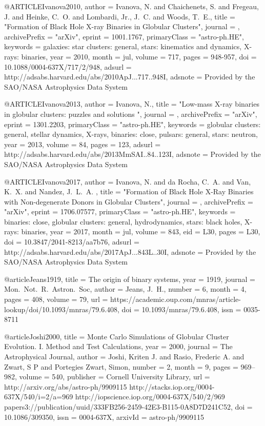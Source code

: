 \documentclass[twocolumn,tighten]{aastex63}
\begin{document}
{{{{{@ARTICLE{Ivanova2010,
   author = {{Ivanova}, N. and {Chaichenets}, S. and {Fregeau}, J. and {Heinke}, C.~O. and 
	{Lombardi}, Jr., J.~C. and {Woods}, T.~E.},
    title = "{Formation of Black Hole X-ray Binaries in Globular Clusters}",
  journal = {\apj},
archivePrefix = "arXiv",
   eprint = {1001.1767},
 primaryClass = "astro-ph.HE",
 keywords = {galaxies: star clusters: general, stars: kinematics and dynamics, X-rays: binaries},
     year = 2010,
    month = jul,
   volume = 717,
    pages = {948-957},
      doi = {10.1088/0004-637X/717/2/948},
   adsurl = {http://adsabs.harvard.edu/abs/2010ApJ...717..948I},
  adsnote = {Provided by the SAO/NASA Astrophysics Data System}
}

@ARTICLE{Ivanova2013,
   author = {{Ivanova}, N.},
    title = "{Low-mass X-ray binaries in globular clusters: puzzles and solutions }",
  journal = {\memsai},
archivePrefix = "arXiv",
   eprint = {1301.2203},
 primaryClass = "astro-ph.HE",
 keywords = {globular clusters: general, stellar dynamics, X-rays, binaries: close, pulsars: general, stars: neutron},
     year = 2013,
   volume = 84,
    pages = {123},
   adsurl = {http://adsabs.harvard.edu/abs/2013MmSAI..84..123I},
  adsnote = {Provided by the SAO/NASA Astrophysics Data System}
}

@ARTICLE{Ivanova2017,
   author = {{Ivanova}, N. and {da Rocha}, C.~A. and {Van}, K.~X. and {Nandez}, J.~L.~A.
	},
    title = "{Formation of Black Hole X-Ray Binaries with Non-degenerate Donors in Globular Clusters}",
  journal = {\apjl},
archivePrefix = "arXiv",
   eprint = {1706.07577},
 primaryClass = "astro-ph.HE",
 keywords = {binaries: close, globular clusters: general, hydrodynamics, stars: black holes, X-rays: binaries},
     year = 2017,
    month = jul,
   volume = 843,
      eid = {L30},
    pages = {L30},
      doi = {10.3847/2041-8213/aa7b76},
   adsurl = {http://adsabs.harvard.edu/abs/2017ApJ...843L..30I},
  adsnote = {Provided by the SAO/NASA Astrophysics Data System}
}

@article{Jeans1919,
    title = {{The origin of binary systems}},
    year = {1919},
    journal = {Mon.~Not.~R.~Astron.~Soc},
    author = {Jeans, J.~H.},
    number = {6},
    month = {4},
    pages = {408},
    volume = {79},
    url = {https://academic.oup.com/mnras/article-lookup/doi/10.1093/mnras/79.6.408},
    doi = {10.1093/mnras/79.6.408},
    issn = {0035-8711}
}

@article{Joshi2000,
    title = {{Monte Carlo Simulations of Globular Cluster Evolution. I. Method and Test Calculations}},
    year = {2000},
    journal = {The Astrophysical Journal},
    author = {Joshi, Kriten J. and Rasio, Frederic A. and Zwart, S P and Portegies Zwart, Simon},
    number = {2},
    month = {9},
    pages = {969--982},
    volume = {540},
    publisher = {Cornell University Library},
    url = {http://arxiv.org/abs/astro-ph/9909115 http://stacks.iop.org/0004-637X/540/i=2/a=969 http://iopscience.iop.org/0004-637X/540/2/969 papers3://publication/uuid/333FB256-2459-42E3-B115-0A8D7D241C52},
    doi = {10.1086/309350},
    issn = {0004-637X},
    arxivId = {astro-ph/9909115}
}

}}}}}
\end{document}
